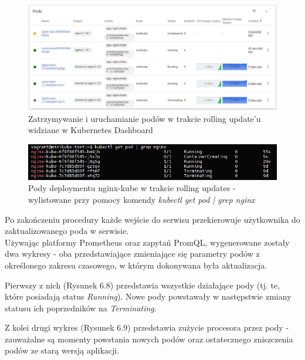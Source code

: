 \begin{figure}[h]
    \centering
    \includegraphics[width=1\textwidth]{img/roll2.png}
    \caption{Zatrzymywanie i uruchamianie podów w trakcie rolling update'u widziane w Kubernetes Dashboard}
\end{figure}

\begin{figure}[h]
    \centering
    \includegraphics[width=1\textwidth]{img/roll1.png}
    \caption{Pody deploymentu nginx-kube w trakcie rolling updates - wylistowane przy pomocy komendy \textit{kubectl get pod | grep nginx}}
\end{figure}

Po zakończeniu procedury każde wejście do serwisu przekierowuje użytkownika do zaktualizowanego poda w serwisie. \\

\iffalse
        Używając platformy Prometheus oraz zapytań PromQL, wygenerowane zostały dwa wykresy - oba przedstawiające zmieniające się parametry podów z określonego zakresu czasowego, w którym dokonywana była aktualizacja. 
        
        Pierwszy z nich (Rysunek 6.8) przedstawia wszystkie działające pody (tj. te, które posiadają status \textit{Running}). Nowe pody powstawały w następstwie zmiany statusu ich poprzedników na \textit{Terminating}.  
        
        Z kolei drugi wykres (Rysunek 6.9) przedstawia zużycie procesora przez pody - zauważalne są momenty powstania nowych podów oraz ostatecznego zniszczenia podów ze starą wersją aplikacji.
        
